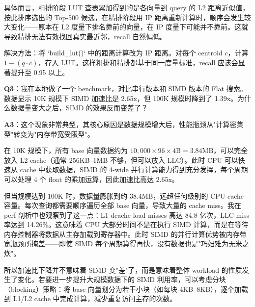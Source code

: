 \documentclass[a4paper]{article}
\begin{document}
具体而言，粗排阶段 LUT 查表累加得到的是各向量到 query 的 L2 距离近似值，按此排序选出的 Top-500 候选，在精排阶段用 IP 距离重新计算时，顺序会发生较大变化——原本在 L2 度量下排名靠前的向量，在 IP 度量下可能并不靠前。这就导致精排无法有效找回真实最近邻，recall 自然偏低。

解决方法：将 `build_lut()` 中的距离计算改为 IP 距离。对每个 centroid $c$，计算 $1 - (q \cdot c)$，存入 LUT。这样粗排和精排都基于同一度量标准，recall 应该会显著提升至 0.95 以上。

\textbf{Q3}：我在本地做了一个 benchmark，对比串行版本和 SIMD 版本的 Flat 搜索。数据显示 10K 规模下 SIMD 加速比是 2.65x，但 100K 规模时降到了 1.39x。为什么数据量变大之后，SIMD 的效果反而变差了？

\textbf{A3}：这个现象非常典型，其核心原因是数据规模增大后，性能瓶颈从"计算密集型"转变为"内存带宽受限型"。

在 10K 规模下，所有 base 向量数据约为 $10{,}000 \times 96 \times 4\text{B} = 3.84\text{MB}$，可以完全放入 L2 cache（通常 256KB--1MB 不够，但可以放入 LLC）。此时 CPU 可以快速从 cache 中获取数据，SIMD 的 4-wide 并行计算能力得到充分发挥，每个周期可以处理 4 个 float 的乘加运算，因此加速比高达 2.65x。

但当规模达到 100K 时，数据量膨胀到约 38.4MB，远超任何级别的 CPU cache 容量。每次查询都需要顺序遍历全部 base 向量，导致大量的 cache miss。我在 perf 剖析中也观察到了这一点：L1 dcache load misses 高达 84.8 亿次，LLC miss 率达到 14.26\%。这意味着 CPU 大部分时间不是在执行 SIMD 计算，而是在等待内存控制器将数据从主存加载到寄存器中。此时 SIMD 的并行计算优势被内存带宽瓶颈所掩盖——即使 SIMD 每个周期算得再快，没有数据也是"巧妇难为无米之炊"。

所以加速比下降并不意味着 SIMD 变"差"了，而是意味着整体 workload 的性质发生了变化。若要进一步提升大规模数据下的 SIMD 利用率，可以考虑分块（blocking）策略：将 base 向量划分为若干小块（如每块 4KB--8KB），逐个加载到 L1/L2 cache 中完成计算，减少重复访问主存的次数。
\end{document}
